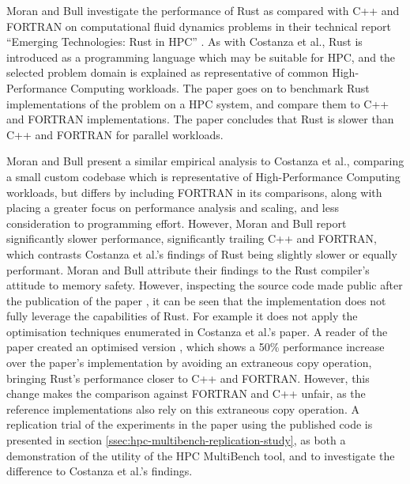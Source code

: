 Moran and Bull \cite{moranEmergingTechnologiesRust2023} investigate the performance of Rust as compared with C++ and FORTRAN on computational fluid dynamics problems in their technical report ``Emerging Technologies: Rust in HPC'' \cite{moranEmergingTechnologiesRust2023}. As with Costanza et al., Rust is introduced as a programming language which may be suitable for HPC, and the selected problem domain is explained as representative of common High-Performance Computing workloads. The paper goes on to benchmark Rust implementations of the problem on a HPC system, and compare them to C++ and FORTRAN implementations. The paper concludes that Rust is slower than C++ and FORTRAN for parallel workloads.

Moran and Bull present a similar empirical analysis to Costanza et al., comparing a small custom codebase which is representative of High-Performance Computing workloads, but differs by including FORTRAN in its comparisons, along with placing a greater focus on performance analysis and scaling, and less consideration to programming effort. However, Moran and Bull report significantly slower performance, significantly trailing C++ and FORTRAN, which contrasts Costanza et al.'s findings of Rust being slightly slower or equally performant. Moran and Bull attribute their findings to the Rust compiler's attitude to memory safety. However, inspecting the source code made public after the publication of the paper \cite{Lmoran94Eurocc_cfdCFD}, it can be seen that the implementation does not fully leverage the capabilities of Rust. For example it does not apply the optimisation techniques enumerated in Costanza et al.'s paper. A reader of the paper created an optimised version  \cite{moranPaperFalse} \cite{phazer99HerePlayground2023}, which shows a 50\% performance increase over the paper's implementation by avoiding an extraneous copy operation, bringing Rust's performance closer to C++ and FORTRAN. However, this change makes the comparison against FORTRAN and C++ unfair, as the reference implementations also rely on this extraneous copy operation. A replication trial of the experiments in the paper using the published code is presented in section \ref{ssec:hpc-multibench-replication-study}, as both a demonstration of the utility of the HPC MultiBench tool, and to investigate the difference to Costanza et al.'s findings. %



